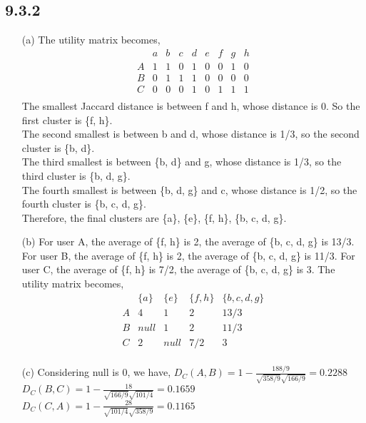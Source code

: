 \documentclass{article}
\begin{document}
\subsection*{9.3.2}
\begin{enumerate}
    \item[(a)]
    The utility matrix becomes,\\
    \[
    \begin{array}{c|cccccccc}
    & a & b & c & d & e & f & g & h \\
    \hline
    A & 1 & 1 & 0 & 1 & 0 & 0 & 1 & 0 \\
    B & 0 & 1 & 1 & 1 & 0 & 0 & 0 & 0 \\
    C & 0 & 0 & 0 & 1 & 0 & 1 & 1 & 1 \\
    \end{array}
    \]
    The smallest Jaccard distance is between f and h, whose distance is 0. So the first cluster is \{f, h\}.\\
    The second smallest is between b and d, whose distance is 1/3, so the second cluster is \{b, d\}.\\
    The third smallest is between \{b, d\} and g, whose distance is 1/3, so the third cluster is \{b, d, g\}.\\
    The fourth smallest is between \{b, d, g\} and c, whose distance is 1/2, so the fourth cluster is \{b, c, d, g\}.\\
    Therefore, the final clusters are \{a\}, \{e\}, \{f, h\}, \{b, c, d, g\}.
    \item[(b)]
    For user A, the average of \{f, h\} is 2,
    the average of \{b, c, d, g\} is 13/3.
    For user B, the average of \{f, h\} is 2,
    the average of \{b, c, d, g\} is 11/3.
    For user C, the average of \{f, h\} is 7/2,
    the average of \{b, c, d, g\} is 3.
    The utility matrix becomes,\\
    \[
    \begin{array}{c|cccccccc}
    & \{a\} & \{e\} & \{f, h\} & \{b, c, d, g\}\\
    \hline
    A & 4 & 1 & 2 & 13/3 \\
    B & null & 1 & 2 & 11/3 \\
    C & 2 & null & 7/2 & 3 \\
    \end{array}
    \]
    
    \item[(c)]
    Considering null is 0, we have,
    \(D_C(A,B) = 1 - \frac{188/9}{\sqrt{358/9}\sqrt{166/9}} = 0.2288\)
    \(D_C(B,C) = 1 - \frac{18}{\sqrt{166/9}\sqrt{101/4}} = 0.1659\)
    \(D_C(C,A) = 1 - \frac{28}{\sqrt{101/4}\sqrt{358/9}} = 0.1165\)



\end{enumerate}
\end{document}
